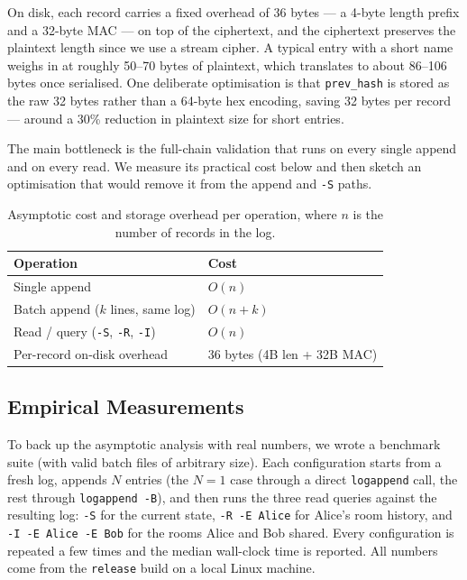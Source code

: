 \documentclass[a4paper, 12pt]{article}
\begin{document}
    On disk, each record carries a fixed overhead of 36 bytes --- a 4-byte length prefix and a 32-byte MAC --- on top of the ciphertext, and the ciphertext preserves the plaintext length since we use a stream cipher. A typical entry with a short name weighs in at roughly 50--70 bytes of plaintext, which translates to about 86--106 bytes once serialised. One deliberate optimisation is that \texttt{prev\_hash} is stored as the raw 32 bytes rather than a 64-byte hex encoding, saving 32 bytes per record --- around a 30\% reduction in plaintext size for short entries.

    The main bottleneck is the full-chain validation that runs on every single append and on every read. We measure its practical cost below and then sketch an optimisation that would remove it from the append and \texttt{-S} paths.

    \begin{table}[H]
        \centering
        \begin{tabular}{ll}
            \toprule
            \textbf{Operation} & \textbf{Cost} \\
            \midrule
            Single append & $O(n)$ \\
            Batch append ($k$ lines, same log) & $O(n + k)$ \\
            Read / query (\texttt{-S}, \texttt{-R}, \texttt{-I}) & $O(n)$ \\
            Per-record on-disk overhead & 36 bytes (4B len + 32B MAC) \\
            \bottomrule
        \end{tabular}
        \caption{Asymptotic cost and storage overhead per operation, where $n$ is the number of records in the log.}
    \end{table}

    \subsection{Empirical Measurements}
    To back up the asymptotic analysis with real numbers, we wrote a benchmark suite (with valid batch files of arbitrary size). Each configuration starts from a fresh log, appends $N$ entries (the $N = 1$ case through a direct \texttt{logappend} call, the rest through \texttt{logappend -B}), and then runs the three read queries against the resulting log: \texttt{-S} for the current state, \texttt{-R -E Alice} for Alice's room history, and \texttt{-I -E Alice -E Bob} for the rooms Alice and Bob shared. Every configuration is repeated a few times and the median wall-clock time is reported. All numbers come from the \texttt{release} build on a local Linux machine.
\end{document}
